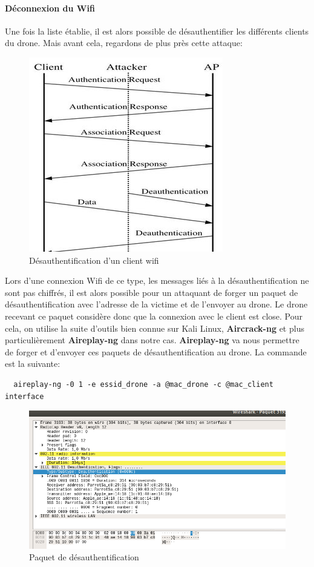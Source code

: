 \paragraph{Déconnexion du Wifi}
Une fois la liste établie, il est alors possible de désauthentifier les différents clients du drone. Mais avant cela, regardons de plus près cette attaque:

\begin{figure}[H]
  \centering
  \includegraphics[scale=1.5]{images/deauth}
  \caption{Désauthentification d'un client wifi}
\end{figure}

Lors d'une connexion Wifi de ce type, les messages liés à la désauthentification ne sont pas chiffrés, il est alors possible pour un attaquant de forger un paquet de désauthentification avec l'adresse de la victime et de l'envoyer au drone. Le drone recevant ce paquet considère donc que la connexion avec le client est close. Pour cela, on utilise la suite d'outils bien connue sur Kali Linux, \textbf{Aircrack-ng} et plus particulièrement \textbf{Aireplay-ng} dans notre cas. \textbf{Aireplay-ng} va nous permettre de forger et d'envoyer ces paquets de désauthentification au drone. La commande est la suivante:
\begin{verbatim}
  aireplay-ng -0 1 -e essid_drone -a @mac_drone -c @mac_client interface
\end{verbatim}

\begin{figure}[H]
  \centering
  \includegraphics[scale=0.65]{images/wireshark}
  \caption{Paquet de désauthentification}
\end{figure}


